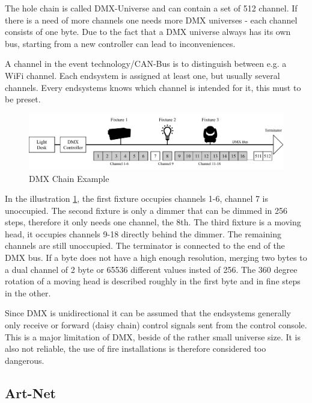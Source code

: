 The hole chain is called DMX-Universe and can contain a set of 512 channel.
If there is a need of more channels one needs more DMX universes - each channel consists of one byte.
Due to the fact that a DMX universe always has its own bus, starting from a new controller can lead to inconveniences.

A channel in the event technology/CAN-Bus is to distinguish between e.g. a WiFi channel.
Each endsystem is assigned at least one, but usually several channels.
Every endsystems knows which channel is intended for it, this must to be preset.

\begin{figure}[h]
	\centering
	\includegraphics[scale=0.6]{figures/DMX_Chain.pdf}
	\caption{DMX Chain Example}
	\label{fig:dmx_chain}
\end{figure}

In the illustration \cref{fig:dmx_chain}, the first fixture occupies channels 1-6, channel 7 is unoccupied.
The second fixture is only a dimmer that can be dimmed in 256 steps, therefore it only needs one channel, the 8th.
The third fixture is a moving head, it occupies channels 9-18 directly behind the dimmer.
The remaining channels are still unoccupied.
The terminator is connected to the end of the DMX bus.
If a byte does not have a high enough resolution, merging two bytes to a dual channel of 2 byte or 65536 different values insted of 256.
The 360 degree rotation of a moving head is described roughly in the first byte and in fine steps in the other.

Since \ac{DMX} is unidirectional it can be assumed that the endsystems generally only receive or forward (daisy chain) control signals sent from the control console.
This is a major limitation of DMX, beside of the rather small universe size.
It is also not reliable, the use of fire installations is therefore considered too dangerous.

\subsection*{Art-Net}
\label{sec:artnet}

